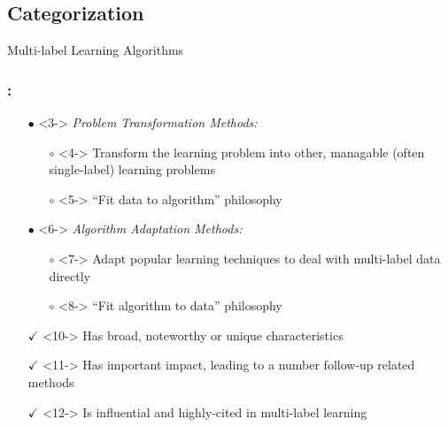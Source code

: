 \documentclass{beamer}
\begin{document}
\subsection{Categorization}
\begin{frame}
\Huge{\centerline{Multi-label Learning Algorithms}}
\end{frame}
\begin{frame}
\frametitle{\insertsection : \insertsubsection}

\begin{itemize}
\item[$\bullet$] <3-> \emph{Problem Transformation Methods:}

\begin{itemize}
\item[$\circ$] <4-> Transform the learning problem into other, managable (often
  single-label) learning
  problems 
\item[$\circ$] <5-> ``Fit data to algorithm'' philosophy
\end{itemize}

\item[$\bullet$] <6-> \emph{Algorithm Adaptation Methods:}
\begin{itemize}
\item[$\circ$] <7-> Adapt popular learning techniques to deal with multi-label data directly
\item[$\circ$] <8-> ``Fit algorithm to data'' philosophy
\end{itemize}
\end{itemize}

\begin{itemize}
\item[$\checkmark$] <10-> Has broad, noteworthy or unique characteristics
\item[$\checkmark$] <11-> Has important impact, leading to a number follow-up related methods
\item[$\checkmark$] <12-> Is influential and highly-cited in multi-label learning
\end{itemize}
\end{frame}
\end{document}
